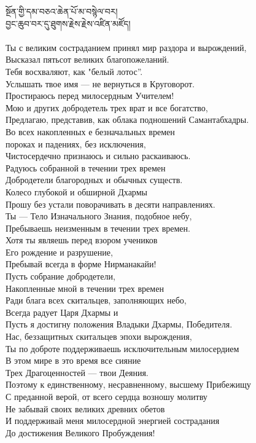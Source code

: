 སྔོན་གྱི་དམ་བཅའ་ཆེན་པོ་མ་བསྙེལ་བར།\\
བྱང་ཆུབ་བར་དུ་ཐུགས་རྗེས་རྗེས་འཛིན་མཛོད།\\
\\
\ru
Ты с великим состраданием принял мир раздора и вырождений,\\
Высказал пятьсот великих благопожеланий.\\
Тебя восхваляют, как "белый лотос”. \\
Услышать твое имя  — не вернуться в Круговорот.\\
Простираюсь перед милосердным Учителем!\\
Мою и других добродетель трех врат и все богатство,\\
Предлагаю, представив, как облака подношений Самантабхадры.\\
Во всех накопленных е безначальных времен\\
пороках и падениях, без исключения,\\
Чистосердечно признаюсь и сильно раскаиваюсь.\\
Радуюсь собранной в течении трех времен\\
Добродетели благородных и обычных существ.\\
Колесо глубокой и обширной Дхармы\\
Прошу без устали поворачивать в десяти направлениях.\\
Ты — Тело Изначального Знания, подобное небу,\\
Пребываешь неизменным в течении трех времен.\\
Хотя ты являешь перед взором учеников\\
Его рождение и разрушение,\\
Пребывай всегда в форме Нирманакайи!\\
Пусть собрание добродетели,\\
Накопленные мной в течении трех времен\\
Ради блага всех скитальцев, заполняющих небо,\\
Всегда радует Царя Дхармы и\\
Пусть я достигну положения Владыки Дхармы, Победителя.\\
Нас, беззащитных скитальцев эпохи вырождения,\\
Ты по доброте поддерживаешь исключительным милосердием\\
В этом мире в это время все сияние\\
Трех Драгоценностей — твои Деяния.\\
Поэтому к единственному, несравненному, высшему Прибежищу\\
С преданной верой, от всего сердца возношу молитву\\
Не забывай своих великих древних обетов\\
И поддерживай меня милосердной энергией сострадания\\
До достижения Великого Пробуждения!\\
\\
\newpage
